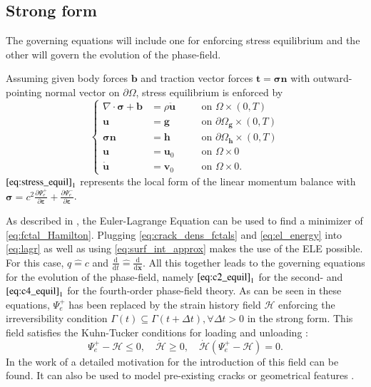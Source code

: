 \subsection{Strong form} \label{sec:strong_form}
The governing equations will include one for enforcing stress equilibrium and the other will govern the evolution of the phase-field.

Assuming given body forces $\mathbf{b}$ and traction vector forces $\mathbf{t}=\bm{\sigma}\mathbf{n}$ with outward-pointing normal vector on $\partial\Omega$, stress equilibrium is enforced by
\begin{equation} \label{eq:stress_equil}
	 \left\{\begin{alignedat}{2}
\nabla\cdot\bm{\sigma}+\mathbf{b} &= \rho\ddot{\mathbf{u}} && \quad\text{on } \Omega\times\left(0,T\right) \\
		\mathbf{u} &= \mathbf{g} && \quad\text{on } \partial\Omega_{\mathbf{g}}\times\left(0,T\right) \\
		\bm{\sigma}\mathbf{n} &= \mathbf{h} && \quad\text{on } \partial\Omega_{\mathbf{h}}\times\left(0,T\right) \\
		\mathbf{u} &= \mathbf{u}_{0} && \quad\text{on } \Omega\times0 \\
		\dot{\mathbf{u}} &= \mathbf{v}_{0} && \quad\text{on } \Omega\times0.
  \end{alignedat}\right.
\end{equation}
$\eqref{eq:stress_equil}_{1}$ represents the local form of the linear momentum balance with $\bm{\sigma}=c^{2}\frac{\partial\Psi_{e}^{+}}{\partial\bm{\varepsilon}}+\frac{\partial\Psi_{e}^{-}}{\partial\bm{\varepsilon}}$.

As described in , the Euler-Lagrange Equation can be used to find a minimizer of \eqref{eq:fctal_Hamilton}. Plugging \eqref{eq:crack_dens_fctals} and \eqref{eq:el_energy} into \eqref{eq:lagr} as well as using \eqref{eq:surf_int_approx} makes the use of the ELE possible. For this case, $q\hat{=}c$ and $\frac{\mathrm{d}}{\mathrm{d}t}\hat{=}\frac{\mathrm{d}}{\mathrm{d}\mathbf{x}}$. All this together leads to the governing equations for the evolution of the phase-field, namely $\eqref{eq:c2_equil}_{1}$ for the second- and $\eqref{eq:c4_equil}_{1}$ for the fourth-order phase-field theory. As can be seen in these equations, $\Psi_{e}^{+}$ has been replaced by the strain history field $\mathcal{H}$ enforcing the irreversibility condition $\Gamma\left(t\right)\subseteq\Gamma\left(t+\Delta t\right), \forall \Delta t>0$ in the strong form. This field satisfies the Kuhn-Tucker conditions for loading and unloading \cite{01_PF_dyn_brittle}:
\begin{equation} \label{eq:KuhnTucker}
	\Psi_{e}^{+}-\mathcal{H}\leq0, \quad \dot{\mathcal{H}}\geq0, \quad \dot{\mathcal{H}}\left(\Psi_{e}^{+}-\mathcal{H}\right)=0.
\end{equation}
In the work of \citet{04_B_VarBrittleProve2} a detailed motivation for the introduction of this field can be found. It can also be used to model pre-existing cracks or geometrical features \cite{01_PF_dyn_brittle}.

